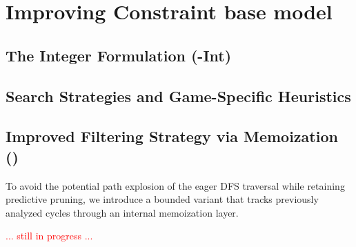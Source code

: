 \documentclass[a4paper,fleqn]{cas-sc}
\begin{document}

\section{Improving Constraint base model}\label{sec:improved_cp}


\subsection{The Integer Formulation (\nooppc-Int)}\label{sec:noc_int}


\subsection{Search Strategies and Game-Specific Heuristics}\label{sec:search_heuristics}


\subsection{Improved Filtering Strategy via Memoization (\nocmemo)}\label{sec:nocmemo}

To avoid the potential path explosion of the eager DFS traversal while retaining predictive pruning, we introduce a bounded variant that tracks previously analyzed cycles through an internal memoization layer.

\textcolor{red}{... still in progress ...}
\end{document}
